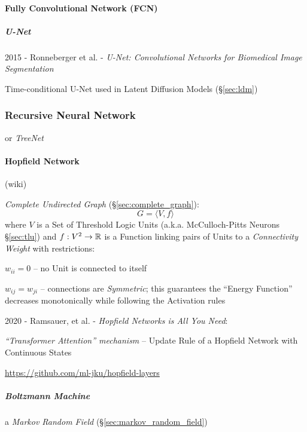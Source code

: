 \paragraph{Fully Convolutional Network (FCN)}\label{sec:fcn}\hfill

\subparagraph{U-Net}\label{sec:unet}\hfill

2015 - Ronneberger et al. -
\emph{U-Net: Convolutional Networks for Biomedical Image Segmentation}

Time-conditional U-Net used in Latent Diffusion Models (\S\ref{sec:ldm})



\subsubsection{Recursive Neural Network}\label{sec:recursive_nn}

or \emph{TreeNet}



\paragraph{Hopfield Network}\label{sec:hopfield_network}\hfill

(wiki)

\emph{Complete Undirected Graph} (\S\ref{sec:complete_graph}):
\[
  G = \langle{V, f}\rangle
\]
where $V$ is a Set of Threshold Logic Units (a.k.a. McCulloch-Pitts Neurons
\S\ref{sec:tlu}) and $f : V^2 \to \mathbb{R}$ is a Function linking pairs of
Units to a \emph{Connectivity Weight} with restrictions:

$w_{ii} = 0$ -- no Unit is connected to itself

$w_{ij} = w_{ji}$ -- connections are \emph{Symmetric}; this guarantees the
``Energy Function'' decreases monotonically while following the Activation rules

\asterism

2020 - Ramsauer, et al. - \emph{Hopfield Networks is All You Need}:

\emph{``Transformer Attention'' mechanism} -- Update Rule of a Hopfield Network
with Continuous States

\url{https://github.com/ml-jku/hopfield-layers}



\subparagraph{Boltzmann Machine}\label{sec:boltzmann_machine}\hfill

a \emph{Markov Random Field} (\S\ref{sec:markov_random_field})

